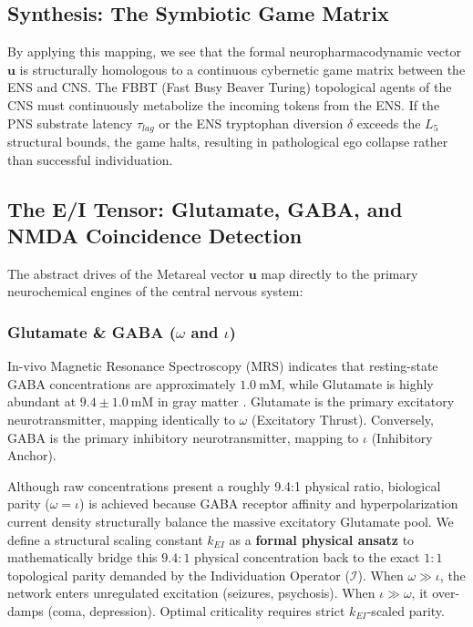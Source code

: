 \begin{hypothesis}
\subsection*{Synthesis: The Symbiotic Game Matrix}

By applying this mapping, we see that the formal neuropharmacodynamic vector $\mathbf{u}$ is structurally homologous to a continuous cybernetic game matrix between the ENS and CNS. The FBBT (Fast Busy Beaver Turing) topological agents of the CNS must continuously metabolize the incoming tokens from the ENS. If the PNS substrate latency $\tau_{lag}$ or the ENS tryptophan diversion $\delta$ exceeds the $L_5$ structural bounds, the game halts, resulting in pathological ego collapse rather than successful individuation.
\end{hypothesis}

\subsection{The E/I Tensor: Glutamate, GABA, and NMDA Coincidence Detection}

The abstract drives of the Metareal vector $\mathbf{u}$ map directly to the primary neurochemical engines of the central nervous system:

\subsubsection{Glutamate \& GABA (\texorpdfstring{$\omega$ and $\iota$}{\omega and \iota})}
In-vivo Magnetic Resonance Spectroscopy (MRS) indicates that resting-state GABA concentrations are approximately $1.0\:\mathrm{mM}$, while Glutamate is highly abundant at $9.4 \pm 1.0\:\mathrm{mM}$ in gray matter \cite{mrs_glutamate}. Glutamate is the primary excitatory neurotransmitter, mapping identically to $\omega$ (Excitatory Thrust). Conversely, GABA is the primary inhibitory neurotransmitter, mapping to $\iota$ (Inhibitory Anchor). 

Although raw concentrations present a roughly 9.4:1 physical ratio, biological parity ($\omega = \iota$) is achieved because GABA receptor affinity and hyperpolarization current density structurally balance the massive excitatory Glutamate pool. We define a structural scaling constant $k_{EI}$ as a \textbf{formal physical ansatz} to mathematically bridge this $9.4:1$ physical concentration back to the exact $1:1$ topological parity demanded by the Individuation Operator ($\mathcal{I}$). When $\omega \gg \iota$, the network enters unregulated excitation (seizures, psychosis). When $\iota \gg \omega$, it over-damps (coma, depression). Optimal criticality requires strict $k_{EI}$-scaled parity.

